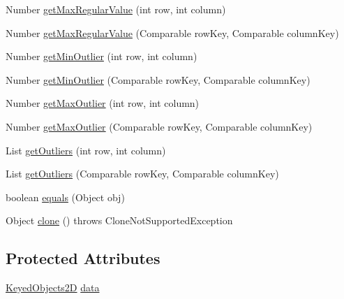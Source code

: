 \begin{DoxyCompactItemize}
\item 
Number \mbox{\hyperlink{classorg_1_1jfree_1_1data_1_1statistics_1_1_default_box_and_whisker_category_dataset_aef4d0917b5702237fdd138fda594fc24}{get\+Max\+Regular\+Value}} (int row, int column)
\item 
Number \mbox{\hyperlink{classorg_1_1jfree_1_1data_1_1statistics_1_1_default_box_and_whisker_category_dataset_acd767ade9e48d8733e4ee21a3b2ed95b}{get\+Max\+Regular\+Value}} (Comparable row\+Key, Comparable column\+Key)
\item 
Number \mbox{\hyperlink{classorg_1_1jfree_1_1data_1_1statistics_1_1_default_box_and_whisker_category_dataset_acf000af1f8d26934b89f80eb042e3b82}{get\+Min\+Outlier}} (int row, int column)
\item 
Number \mbox{\hyperlink{classorg_1_1jfree_1_1data_1_1statistics_1_1_default_box_and_whisker_category_dataset_a58596fb253f18d48239573568d9d4393}{get\+Min\+Outlier}} (Comparable row\+Key, Comparable column\+Key)
\item 
Number \mbox{\hyperlink{classorg_1_1jfree_1_1data_1_1statistics_1_1_default_box_and_whisker_category_dataset_aa21c2cd039abf342549c19731543eea5}{get\+Max\+Outlier}} (int row, int column)
\item 
Number \mbox{\hyperlink{classorg_1_1jfree_1_1data_1_1statistics_1_1_default_box_and_whisker_category_dataset_a566f976a566e583b34846b17d4fd79c2}{get\+Max\+Outlier}} (Comparable row\+Key, Comparable column\+Key)
\item 
List \mbox{\hyperlink{classorg_1_1jfree_1_1data_1_1statistics_1_1_default_box_and_whisker_category_dataset_a25d77e5239cf4b5619fbdca15ef65152}{get\+Outliers}} (int row, int column)
\item 
List \mbox{\hyperlink{classorg_1_1jfree_1_1data_1_1statistics_1_1_default_box_and_whisker_category_dataset_ac2079ef29d157fe4fc20e8659fe01741}{get\+Outliers}} (Comparable row\+Key, Comparable column\+Key)
\item 
boolean \mbox{\hyperlink{classorg_1_1jfree_1_1data_1_1statistics_1_1_default_box_and_whisker_category_dataset_a16046d71d25b86c454dd34f11ea52213}{equals}} (Object obj)
\item 
Object \mbox{\hyperlink{classorg_1_1jfree_1_1data_1_1statistics_1_1_default_box_and_whisker_category_dataset_a507454dd4ad64545d2895e322611034e}{clone}} ()  throws Clone\+Not\+Supported\+Exception 
\end{DoxyCompactItemize}
\subsection*{Protected Attributes}
\begin{DoxyCompactItemize}
\item 
\mbox{\hyperlink{classorg_1_1jfree_1_1data_1_1_keyed_objects2_d}{Keyed\+Objects2D}} \mbox{\hyperlink{classorg_1_1jfree_1_1data_1_1statistics_1_1_default_box_and_whisker_category_dataset_a0392ad3dc25ab5ed2a45ef4d8de14cb3}{data}}
\end{DoxyCompactItemize}
